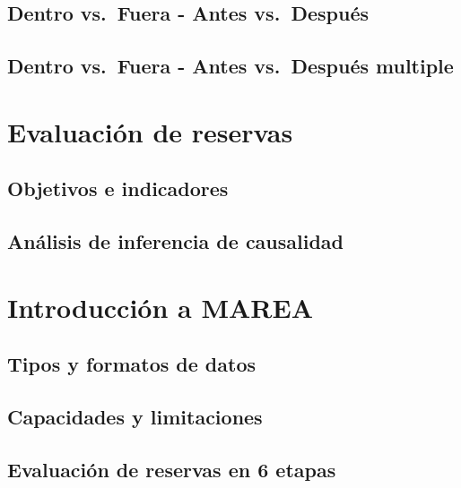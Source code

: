 \documentclass[]{krantz}
\begin{document}
\hypertarget{dentro-vs.fuera---antes-vs.despues}{%
\section{Dentro vs.~Fuera - Antes
vs.~Después}\label{dentro-vs.fuera---antes-vs.despues}}

\hypertarget{dentro-vs.fuera---antes-vs.despues-multiple}{%
\section{Dentro vs.~Fuera - Antes vs.~Después
multiple}\label{dentro-vs.fuera---antes-vs.despues-multiple}}

\hypertarget{evaluacion-de-reservas}{%
\chapter{Evaluación de reservas}\label{evaluacion-de-reservas}}

\hypertarget{objetivos-e-indicadores}{%
\section{Objetivos e indicadores}\label{objetivos-e-indicadores}}

\hypertarget{analisis-de-inferencia-de-causalidad}{%
\section{Análisis de inferencia de
causalidad}\label{analisis-de-inferencia-de-causalidad}}

\hypertarget{introduccion-a-marea}{%
\chapter{Introducción a MAREA}\label{introduccion-a-marea}}

\hypertarget{tipos-y-formatos-de-datos}{%
\section{Tipos y formatos de datos}\label{tipos-y-formatos-de-datos}}

\hypertarget{capacidades-y-limitaciones}{%
\section{Capacidades y limitaciones}\label{capacidades-y-limitaciones}}

\hypertarget{evaluacion-de-reservas-en-6-etapas}{%
\section{Evaluación de reservas en 6
etapas}\label{evaluacion-de-reservas-en-6-etapas}}
\end{document}
